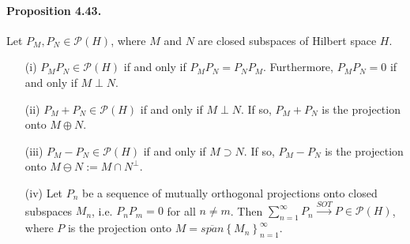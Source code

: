 \documentclass{article}
\begin{document}
\paragraph{Proposition 4.43.\label{prop:4.43}} Let $P_M,P_N\in\mathcal{P}(H)$, where $M$ and $N$ are closed subspaces of Hilbert space $H$.
\begin{itemize}
	\item[(i)] $P_MP_N\in\mathcal{P}(H)$ if and only if $P_MP_N=P_NP_M$. Furthermore, $P_MP_N=0$ if and only if $M\perp N$.
	\item[(ii)] $P_M+P_N\in\mathcal{P}(H)$ if and only if $M\perp N$. If so, $P_M+P_N$ is the projection onto $M\oplus N$.
	\item[(iii)] $P_M-P_N\in\mathcal{P}(H)$ if and only if $M\supset N$. If so, $P_M-P_N$ is the projection onto $M\ominus N:= M\cap N^\perp$.
	\item[(iv)] Let $P_n$ be a sequence of mutually orthogonal projections onto closed subspaces $M_n$, i.e. $P_nP_m=0$ for all $n\neq m$. Then $\sum_{n=1}^\infty P_n\overset{SOT}{\to} P\in\mathcal{P}(H)$, where $P$ is the projection onto $M=\overline{span}\left\{M_n\right\}_{n=1}^\infty$.
\end{itemize}
\end{document}
